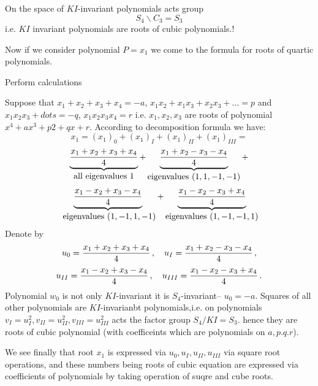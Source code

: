   On the space of $KI$-invariant polynomials acts group
        $$
      S_4\backslash C_3=S_3
        $$
 i.e. $KI$ invariant polynomials are roots of cubic polynomials.!

Now if we consider polynomial $P=x_1$ we come to the formula for 
roots of quartic polynomials.



Perform calculations

Suppose that $x_1+x_2+x_3+x_4=-a$, $x_1x_2+x_1x_3+x_2x_3+\dots=p$
and $x_1x_2x_3+dots=-q$, $x_1x_2x_3x_4=r$ i.e.
$x_1,x_2,x_3$ are roots of polynomial
$x^4+ax^3+p2+qx+r$.   According to decomposition formula  
 we have:
        $$
x_1=({x_1})_0+({x_1})_I+({x_1})_{II}+({x_1})_{III}=
        $$
        $$
\underbrace{x_1+ x_2+x_3+x_4\over 4}_{\hbox{all eigenvalues $1$}}+
\underbrace{x_1+ x_2-x_3-x_4\over 4}_{\hbox{eigenvalues $(1,1,-1,-1)$}}+
          $$
        $$
\underbrace{x_1- x_2+x_3-x_4\over 4}_{\hbox{ eigenvalues $(1,-1,1,-1)$}}+
\underbrace{x_1- x_2-x_3+x_4\over 4}_{\hbox{eigenvalues $(1,-1,-1,1)$}}
        $$
Denote by
       $$
u_0={{x_1+ x_2+x_3+x_4\over 4}}\,,\quad
u_{I}={{x_1+ x_2-x_3-x_4\over 4}}\,,
       $$
       $$
u_{II}={{x_1-x_2+x_3-x_4\over 4}}\,,\quad
u_{III}={{x_1-x_2-x_3+x_4\over 4}}\,.
       $$
Polynomial $w_0$ is not only $KI$-invariant it is $S_4$-invariant--
$u_0=-a$.   Squares of all other polynomials are $KI$-invarianbt
polynomials,i.e.
on polynomials $v_{I}=u^2_{I}, v_{II}=u^2_{II}, v_{III}=u^2_{III}$
acts the factor group $S_4/KI=S_3$.
 hence they are roots of cubic polynomial
(with coefficeints which are polynomials on $a,p.q.r$).

We see finally that root $x_1$ is expressed via $u_0,u_I,u_{II},
u_{III}$ via square root operations, and these numbers
being roots of cubic equation
are expressed via coefficients of polynomials by taking
 operation of suqre and cube roots.\finish 

\bye
